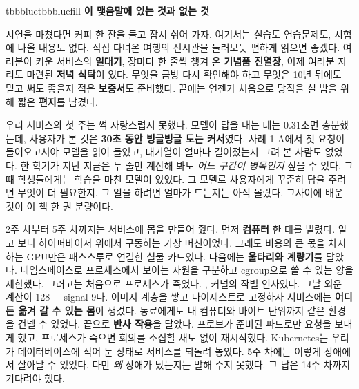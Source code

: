 
\begin{calloutbox}{tbbblue}{tbbbluefill}
{\normalsize\bfseries\color{tbbblue}이 맺음말에 있는 것과 없는 것}\par\vspace{3pt}
시연을 마쳤다면 커피 한 잔을 들고 잠시 쉬어 가자. 여기서는 실습도 연습문제도, 시험에 나올 내용도 없다. 직접 다녀온 여행의 전시관을 둘러보듯 편하게 읽으면 좋겠다. 여러분이 키운 서비스의 \textbf{일대기}, 장마다 한 줄씩 챙겨 온 \textbf{기념품 진열장}, 이제 여러분 자리도 마련된 \textbf{저녁 식탁}이 있다. 무엇을 금방 다시 확인해야 하고 무엇은 10년 뒤에도 믿고 써도 좋을지 적은 \textbf{보증서}도 준비했다. 끝에는 언젠가 처음으로 당직을 설 밤을 위해 짧은 \textbf{편지}를 남겼다.
\end{calloutbox}

\vspace{4.0pt}


우리 서비스의 첫 주는 썩 자랑스럽지 못했다. 모델이 답을 내는 데는 0.31초면 충분했는데, 사용자가 본 것은 \textbf{30초 동안 빙글빙글 도는 커서}였다. 사례 1-A에서 첫 요청이 들어오고서야 모델을 읽어 들였고, 대기열이 얼마나 길어졌는지 그려 본 사람도 없었다. 한 학기가 지난 지금은 두 줄만 계산해 봐도 \textit{어느 구간이 병목인지} 짚을 수 있다. 그때 학생들에게는 학습을 마친 모델이 있었다. 그 모델로 사용자에게 꾸준히 답을 주려면 무엇이 더 필요한지, 그 일을 하려면 얼마가 드는지는 아직 몰랐다. 그사이에 배운 것이 이 책 한 권 분량이다.

2주 차부터 5주 차까지는 서비스에 몸을 만들어 줬다. 먼저 \textbf{컴퓨터} 한 대를 빌렸다. 알고 보니 하이퍼바이저 위에서 구동하는 가상 머신이었다. 그래도 비용의 큰 몫을 차지하는 GPU만은 패스스루로 연결한 실물 카드였다. 다음에는 \textbf{울타리와 계량기}를 달았다. 네임스페이스로 프로세스에서 보이는 자원을 구분하고 cgroup으로 쓸 수 있는 양을 제한했다. 그러고는 처음으로 프로세스가 죽었다. , 커널의 작별 인사였다. 그날 외운 계산이 128 + signal 9다. 이미지 계층을 쌓고 다이제스트로 고정하자 서비스에는 \textbf{어디든 옮겨 갈 수 있는 몸}이 생겼다. 동료에게도 내 컴퓨터와 바이트 단위까지 같은 환경을 건넬 수 있었다. 끝으로 \textbf{반사 작용}을 달았다. 프로브가 준비된 파드로만 요청을 보내게 했고, 프로세스가 죽으면 회의를 소집할 새도 없이 재시작했다. Kubernetes는 우리가 데이터베이스에 적어 둔 상태로 서비스를 되돌려 놓았다. 5주 차에는 이렇게 장애에서 살아날 수 있었다. 다만 \textit{왜} 장애가 났는지는 말해 주지 못했다. 그 답은 14주 차까지 기다려야 했다.


